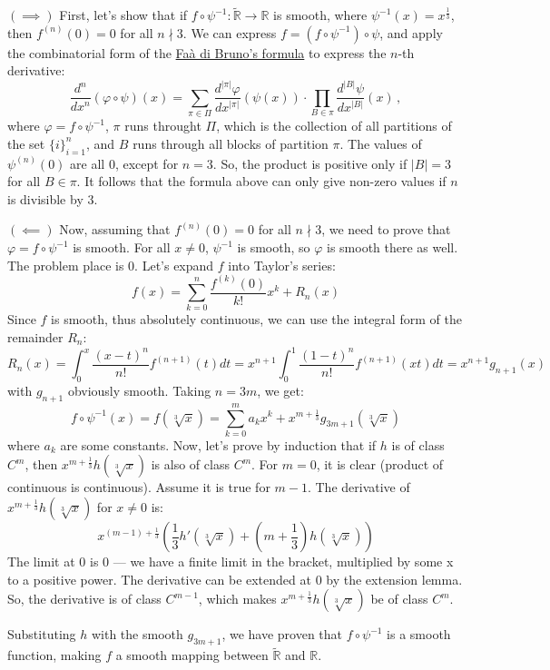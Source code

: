 \documentclass[a4paper]{article}
\begin{document}
\begin{exercise}[2-5 (b)]
  $(\implies)$ First, let's show that if $f \circ \psi^{-1}\colon \widetilde{\mathbb{R}}\to \mathbb{R}$ is smooth, 
  where $\psi^{-1}(x) = x^{\frac{1}{3}} $, then $f^{(n)} (0) = 0$ for all $n \nmid 3$.
  We can express $f = (f \circ \psi^{-1}) \circ \psi$, and apply the combinatorial
  form of the \href{https://en.wikipedia.org/wiki/Fa%C3%A0_di_Bruno%27s_formula}{Faà di Bruno's formula}
  to express the $n$-th derivative:
  $$
  \frac{d ^n}{d x^n} (\varphi \circ \psi) (x)=
  \sum_{\pi \in \Pi}
    \frac{d^{|\pi|} \varphi}{d x^{|\pi|} }  \left( \psi(x) \right) \cdot
    \prod_{B \in \pi} \frac{d^{|B|} \psi}{d x^{|B|} } (x)\,,
  $$
  where $\varphi = f \circ \psi^{-1}$, $\pi$ runs throught $\Pi$, which is the
  collection of all partitions of the set $\{i\}_{i=1}^n$, and $B$ runs through
  all blocks of partition $\pi$. The values of $\psi^{(n)} (0)$ are all $0$, except
  for $n = 3$. So, the product is positive only if $|B| = 3$ for all $B \in \pi$.
  It follows that the formula above can only give non-zero values if $n$ is divisible
  by $3$.

  $(\impliedby)$ Now, assuming that $f^{(n)} (0) = 0$ for all $n \nmid 3$, we need to prove that
  $\varphi = f \circ \psi^{-1}$ is smooth. For all $x \ne 0$, $\psi^{-1}$ is smooth,
  so $\varphi$ is smooth there as well. The problem place is $0$. Let's expand $f$
  into Taylor's series:
  $$
  f(x) = \sum_{k=0}^n \frac{f^{(k)}(0)}{k!} x^k + R_n(x)
  $$
  Since $f$ is smooth, thus absolutely continuous, we can use the integral form
  of the remainder $R_n$:
  $$
  R_n(x) = \int_{0}^x \frac{(x-t)^n}{n!} f^{(n+1)}(t) dt= x^{n+1} \int_0^1\frac{(1-t)^n}{n!}f^{(n+1)}(x t)dt= x^{n+1} g_{n+1}(x)
  $$
  with $g_{n+1} $ obviously smooth. Taking $n = 3m$, we get:
  $$
  f \circ \psi^{-1}(x) = f(\sqrt[3]{x}) = \sum_{k=0}^m a_k x^k + x^{m+\frac{1}{3}}g_{3m+1}(\sqrt[3]{x})
  $$
  where $a_k$ are some constants. Now, let's prove by induction that if $h$ is of class $C^m$, then
  $x^{m+\frac{1}{3}} h\left(\sqrt[3]{x}\right)$ is also of class $C^m$.
  For $m=0$, it is clear (product of continuous is continuous). Assume it is true
  for $m-1$. The derivative of $x^{m+\frac{1}{3}} h(\sqrt[3]{x}) $ for $x\ne 0$ is:
  $$
  x^{(m-1) +\frac{1}{3}} \left(\frac{1}{3}h'\left( \sqrt[3]{x} \right)  + \left( m+\frac{1}{3} \right) h \left( \sqrt[3]{x} \right)  \right )
  $$
  The limit at $0$ is $0$ --- we have a finite limit in the bracket, multiplied by some x to a positive power.
  The derivative can be extended at $0$ by the extension lemma. So, the derivative
  is of class $C^{m-1}$, which makes $x^{m+\frac{1}{3}} h\left(\sqrt[3]{x}\right)$
  be of class $C^m$.

  Substituting $h$ with the smooth $g_{3m+1} $, we have proven that $f \circ \psi^{-1}$
  is a smooth function, making $f$ a smooth mapping between $\widetilde{\mathbb{R}}$
  and $\mathbb{R}$.
\end{exercise}
\end{document}
